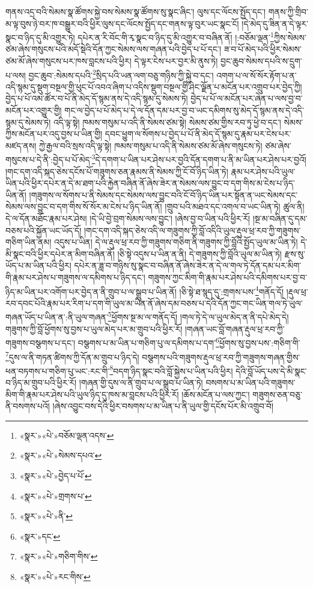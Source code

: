 གནས་འདྲ་བའི་སེམས་སྣ་ཚོགས་སྐྱེ་བས་སེམས་སྣ་ཚོགས་སུ་སྣང་ཞིང་། ལུས་དང་ལོངས་སྤྱོད་དང་། གནས་ཀྱི་གྲིབ་མ་ལྟ་བུས་ཉེ་བར་ཁ་བསྒྱུར་བའི་ཕྱིར་ལུས་དང་ལོངས་སྤྱོད་དང་གནས་ལྟ་བུར་ཡང་སྣང་ངོ། །དེ་མེད་དུ་ཟིན་ན་དེ་ལྟར་སྣང་བ་ཉིད་དུ་མི་འགྱུར་ཏེ། དཔེར་ན་རི་བོང་གི་རྭ་སྣང་བ་ཉིད་དུ་མི་འགྱུར་བ་བཞིན་ནོ། །:བཅོམ་ལྡན་\footnote{«སྣར་»«པེ་»བཅོམ་ལྡན་འདས་}ཀྱིས་སེམས་ཙམ་ཞེས་གསུངས་པའི་མདོ་སྡེའི་དོན་ཀྱང་སེམས་ལས་གཞན་པའི་བྱེད་པ་པོ་དང་། ཟ་བ་པོ་མེད་པའི་ཕྱིར་སེམས་ཙམ་མོ་ཞེས་གསུངས་པར་ཁས་བླངས་པའི་ཕྱིར། དེ་ལྟར་ངེས་པར་བྱར་མི་ནུས་ཏེ། བྱང་ཆུབ་སེམས་དཔའི་ས་དྲུག་པ་ལས། བྱང་ཆུབ་:སེམས་དཔའི་\footnote{«སྣར་»«པེ་»སེམས་དཔའ་}སྲིད་པའི་ཡན་ལག་བཅུ་གཉིས་ཀྱི་སྐྱེ་བ་དང་། འགག་པ་ལ་སོ་སོར་རྟོག་པ་ན་འདི་སྙམ་དུ་སྡུག་བསྔལ་གྱི་ཕུང་པོ་འབའ་ཞིག་པ་འདིས་སྡུག་བསྔལ་གྱི་ཤིང་ལྗོན་པ་མངོན་པར་འགྲུབ་པར་བྱེད་ཀྱི། བྱེད་པ་པོ་འམ་ཚོར་བ་པོ་ནི་མེད་དོ་སྙམ་ནས་དེ་འདི་སྙམ་དུ་སེམས་ཏེ། བྱེད་པ་པོ་ལ་མངོན་པར་ཞེན་པ་ལས་བྱ་བ་མངོན་པར་འགྱུར་གྱི། གང་ལ་བྱེད་པ་པོ་མེད་པ་དེ་ལ་དོན་དམ་པར་བྱ་བ་ཡང་དམིགས་སུ་མེད་དོ་སྙམ་ནས་དེ་འདི་སྙམ་དུ་སེམས་ཏེ། འདི་ལྟ་སྟེ། ཁམས་གསུམ་པ་འདི་ནི་སེམས་ཙམ་སྟེ། སེམས་ཙམ་གྱིས་རབ་ཏུ་ཕྱེ་བ་དང་། སེམས་ཀྱིས་མངོན་པར་འདུ་བྱས་པ་ཡིན་གྱི། དབང་ཕྱུག་ལ་སོགས་པ་བྱེད་པ་པོ་ནི་མེད་དོ་སྙམ་དུ་རྣམ་པར་ངེས་པར་མཛད་ནས། ཀྱེ་རྒྱལ་བའི་སྲས་འདི་ལྟ་སྟེ། ཁམས་གསུམ་པ་འདི་ནི་སེམས་ཙམ་མོ་ཞེས་གསུངས་ཏེ། ཙམ་ཞེས་གསུངས་པ་དེ་ནི་:བྱེད་པ་པོ་མེད་\footnote{«སྣར་»«པེ་»བྱེད་པ་པོ་}དེ་དགག་པ་ཡིན་པར་ཤེས་པར་བྱའི་དོན་དགག་པ་ནི་མ་ཡིན་པར་ཤེས་པར་བྱའོ། །གང་དག་འདི་སྐད་ཅེས་དངོས་པོ་གཟུགས་ཅན་རྣམས་ནི་སེམས་ཀྱི་ངོ་བོ་ཉིད་ཡིན་ཏེ། རྣམ་པར་ཤེས་པའི་ཡུལ་ཡིན་པའི་ཕྱིར་དཔེར་ན་དེ་མ་ཐག་པའི་རྐྱེན་བཞིན་ནོ་ཞེས་ཟེར་ན་སེམས་ལས་བྱུང་བ་དག་གིས་མ་ངེས་པ་ཉིད་ཡིན་ནོ། །གཟུགས་ལ་སོགས་པ་ནི་སེམས་དང་སེམས་ལས་བྱུང་བའི་ངོ་བོ་ཉིད་ཡིན་པར་སྟོན་ན་ཡང་སེམས་དང་སེམས་ལས་བྱུང་བ་དག་གིས་སོ་སོར་མ་ངེས་པ་ཉིད་ཡིན་ནོ། །གྲུབ་པའི་མཐའ་དང་འགལ་བ་ཡང་ཡིན་ཏེ། ཚུལ་ནི། དེ་ལ་དོན་མཐོང་རྣམ་པར་ཤེས། །དེ་ཡི་བྱེ་བྲག་སེམས་ལས་བྱུང་། །ཞེས་བྱ་བ་ཡིན་པའི་ཕྱིར་རོ། །སྔ་མ་བཞིན་དུ་དམ་བཅས་པའི་སྐྱོན་ཡང་ཡོད་དོ། །གང་དག་འདི་སྐད་ཅེས་འདི་ལ་གཟུགས་ཀྱི་བློ་འདིའི་ཡུལ་རྡུལ་ཕྲ་རབ་ཀྱི་གཟུགས་གཅིག་ཡིན་ནམ། འདུས་པ་ཡིན། དེ་ལ་རྡུལ་ཕྲ་རབ་ཀྱི་གཟུགས་གཅིག་ནི་གཟུགས་ཀྱི་བློའི་སྤྱོད་ཡུལ་མ་ཡིན་ཏེ། དེ་མི་སྣང་བའི་ཕྱིར་དཔེར་ན་མིག་བཞིན་ནོ། །ཅི་སྟེ་འདུས་པ་ཡིན་ན་ནི། དེ་གཟུགས་ཀྱི་བློའི་ཡུལ་མ་ཡིན་ཏེ། རྫས་སུ་ཡོད་པ་མ་ཡིན་པའི་ཕྱིར། དཔེར་ན་ཟླ་བ་གཉིས་སུ་སྣང་བ་བཞིན་ནོ་ཞེས་ཟེར་ན་དེ་ལ་གལ་ཏེ་དོན་དམ་པར་མིག་གི་རྣམ་པར་ཤེས་པ་གཟུགས་ལ་དམིགས་པ་ཉིད་དང་། གཟུགས་ཀྱང་མིག་གི་རྣམ་པར་ཤེས་པའི་དམིགས་པར་བྱ་བ་ཉིད་མ་ཡིན་པར་འགོག་པར་བྱེད་ན་ནི་གྲུབ་པ་ལ་སྒྲུབ་པ་ཡིན་ནོ། །ཅི་སྟེ་ཐ་སྙད་དུ་:གྲགས་པས་\footnote{«སྣར་»«པེ་»གྲགས་པ་}གནོད་དོ། །རྡུལ་ཕྲ་རབ་དབང་པོའི་རྣམ་པར་རིག་པ་དག་གི་ཡུལ་མ་ཡིན་ནོ་ཞེས་དམ་བཅས་པ་དེའི་དོན་ཀྱང་གང་ཡིན་གལ་ཏེ་ཡུལ་གཞན་ཡོད་པ་ཡིན་ན་:ནི་ཡུལ་གཞན་\footnote{«སྣར་»«པེ་»ནི་}ཕྱོགས་སྔ་མ་ལ་གནོད་དོ། །གལ་ཏེ་དེ་ལ་ཡུལ་མེད་ན་ནི་དཔེ་མེད་དེ། གཟུགས་ཀྱི་བློ་ཕྱོགས་སུ་བྱས་པ་ཡུལ་མེད་པར་མ་གྲུབ་པའི་ཕྱིར་རོ། །གཞན་ཡང་བློ་གཞན་རྡུལ་ཕྲ་རབ་ཀྱི་གཟུགས་བསྩགས་པ་དང་། བསྩགས་པ་མ་ཡིན་པ་གཅིག་པུ་ལ་དམིགས་པ་དག་\footnote{«སྣར་»དང་}ཕྱོགས་སུ་བྱས་པས་:གཅིག་གི་\footnote{«སྣར་»«པེ་»གཅིག་གིས་}དུས་ལ་ནི་གཏན་ཚིགས་ཀྱི་དོན་མ་གྲུབ་པ་ཉིད་དེ། བསྩགས་པའི་གཟུགས་རྡུལ་ཕྲ་རབ་ཀྱི་གཟུགས་གཞན་གྱིས་ཕན་བཏགས་པ་གཅིག་པུ་ཡང་:རང་གི་\footnote{«སྣར་»«པེ་»རང་གིས་}བདག་ཉིད་སྣང་བའི་བློ་སྐྱེས་པ་ཡིན་པའི་ཕྱིར། དེའི་བློ་ཡོད་པས་དེ་མི་སྣང་བ་ཉིད་མ་གྲུབ་པའི་ཕྱིར་རོ། །གཞན་གྱི་དུས་ལ་ནི་གྲུབ་པ་ལ་སྒྲུབ་པ་ཡིན་ཏེ། བསགས་པ་མ་ཡིན་པའི་གཟུགས་མིག་གི་རྣམ་པར་ཤེས་པའི་ཡུལ་ཉིད་དུ་ཁས་མ་བླངས་པའི་ཕྱིར་རོ། །ཆོས་མངོན་པ་ལས་ཀྱང་། གཟུགས་ཅན་བཅུ་ནི་བསགས་པའོ། །ཞེས་འབྱུང་བས་དེའི་ཕྱིར་བསགས་པ་མ་ཡིན་པ་ནི་ཡུལ་གྱི་དངོས་པོར་མི་འགྲུབ་བོ། 